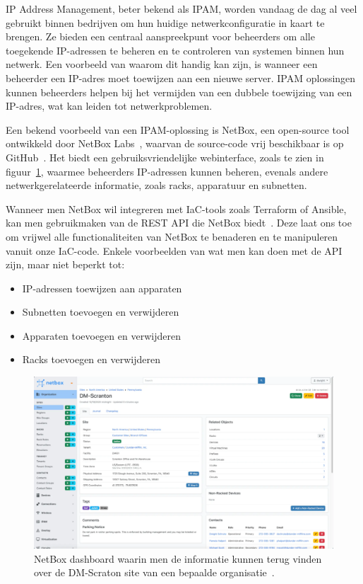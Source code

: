 IP Address Management, beter bekend als IPAM, worden vandaag de dag al veel gebruikt binnen bedrijven om hun huidige netwerkconfiguratie in kaart te brengen.
Ze bieden een centraal aanspreekpunt voor beheerders om alle toegekende IP-adressen te beheren en te controleren van systemen binnen hun netwerk.
Een voorbeeld van waarom dit handig kan zijn, is wanneer een beheerder een IP-adres moet toewijzen aan een nieuwe server.
IPAM oplossingen kunnen beheerders helpen bij het vermijden van een dubbele toewijzing van een IP-adres, wat kan leiden tot netwerkproblemen.

Een bekend voorbeeld van een IPAM-oplossing is NetBox, een open-source tool ontwikkeld door NetBox Labs~\autocite{netbox-ipam}, waarvan de source-code vrij beschikbaar is op GitHub~\autocite{netbox-github}.
Het biedt een gebruiksvriendelijke webinterface, zoals te zien in figuur~\ref{fig:netbox-dashboard}, waarmee beheerders IP-adressen kunnen beheren, evenals andere netwerkgerelateerde informatie, zoals racks, apparatuur en subnetten.

Wanneer men NetBox wil integreren met IaC-tools zoals Terraform of Ansible, kan men gebruikmaken van de REST API die NetBox biedt~\autocite{netbox-api}.
Deze laat ons toe om vrijwel alle functionaliteiten van NetBox te benaderen en te manipuleren vanuit onze IaC-code.
Enkele voorbeelden van wat men kan doen met de API zijn, maar niet beperkt tot:

\begin{itemize}
    \item IP-adressen toewijzen aan apparaten
    \item Subnetten toevoegen en verwijderen
    \item Apparaten toevoegen en verwijderen
    \item Racks toevoegen en verwijderen
\end{itemize}

\begin{figure}[h!]
    \includegraphics[width=\textwidth]
    {./graphics/state-of-the-art/netbox-dashboard.png}
    \caption[NetBox dashboard voor DM-Scraton.]{\label{fig:netbox-dashboard}NetBox dashboard waarin men de informatie kunnen terug vinden over de DM-Scraton site van een bepaalde organisatie~\autocite{netbox-dashboard}.}
\end{figure}

